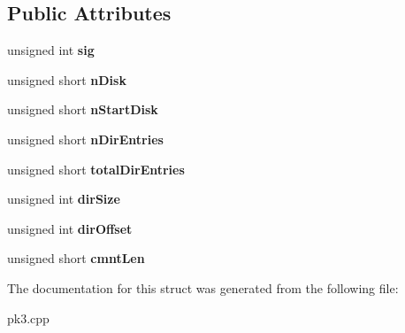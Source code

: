 \subsection*{Public Attributes}
\begin{DoxyCompactItemize}
\item 
unsigned int {\bfseries sig}\hypertarget{structCPK3_1_1TZipDirHeader_aa027d74f636d63ff53cc053445bf522c}{}\label{structCPK3_1_1TZipDirHeader_aa027d74f636d63ff53cc053445bf522c}

\item 
unsigned short {\bfseries n\+Disk}\hypertarget{structCPK3_1_1TZipDirHeader_a6fe2b3129f03f9c5ba5d13213a59c68f}{}\label{structCPK3_1_1TZipDirHeader_a6fe2b3129f03f9c5ba5d13213a59c68f}

\item 
unsigned short {\bfseries n\+Start\+Disk}\hypertarget{structCPK3_1_1TZipDirHeader_a22f89f0653741890e6f2c8185033e94f}{}\label{structCPK3_1_1TZipDirHeader_a22f89f0653741890e6f2c8185033e94f}

\item 
unsigned short {\bfseries n\+Dir\+Entries}\hypertarget{structCPK3_1_1TZipDirHeader_a72c2fd537b0c9e36dc89b72020e51d83}{}\label{structCPK3_1_1TZipDirHeader_a72c2fd537b0c9e36dc89b72020e51d83}

\item 
unsigned short {\bfseries total\+Dir\+Entries}\hypertarget{structCPK3_1_1TZipDirHeader_a31735f89e91da4efb23508fa134dfe00}{}\label{structCPK3_1_1TZipDirHeader_a31735f89e91da4efb23508fa134dfe00}

\item 
unsigned int {\bfseries dir\+Size}\hypertarget{structCPK3_1_1TZipDirHeader_a2e5d42ee84bfedc4b6eada3ac565decc}{}\label{structCPK3_1_1TZipDirHeader_a2e5d42ee84bfedc4b6eada3ac565decc}

\item 
unsigned int {\bfseries dir\+Offset}\hypertarget{structCPK3_1_1TZipDirHeader_a0526a9433eeedf63b19158f43439cb9e}{}\label{structCPK3_1_1TZipDirHeader_a0526a9433eeedf63b19158f43439cb9e}

\item 
unsigned short {\bfseries cmnt\+Len}\hypertarget{structCPK3_1_1TZipDirHeader_a6dc09b45d3595dd287ceb4b9b913a617}{}\label{structCPK3_1_1TZipDirHeader_a6dc09b45d3595dd287ceb4b9b913a617}

\end{DoxyCompactItemize}


The documentation for this struct was generated from the following file\+:\begin{DoxyCompactItemize}
\item 
pk3.\+cpp\end{DoxyCompactItemize}
